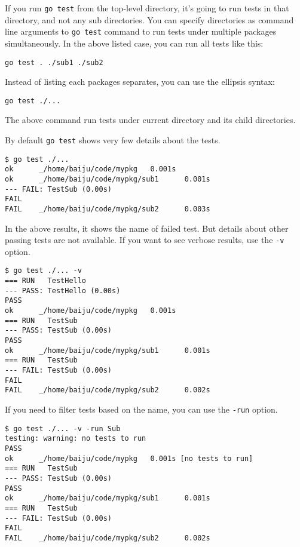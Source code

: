 If you run \texttt{go test} from the top-level directory, it's going
to run tests in that directory, and not any sub directories.  You can
specify directories as command line arguments to \texttt{go test}
command to run tests under multiple packages simultaneously.
In the above listed case, you can run all tests like this:

\begin{lstlisting}[numbers=none]
go test . ./sub1 ./sub2
\end{lstlisting}

Instead of listing each packages separates, you can use the ellipsis
syntax:

\begin{lstlisting}[numbers=none]
go test ./...
\end{lstlisting}

The above command run tests under current directory and its child
directories.

By default \texttt{go test} shows very few details about the tests.

\begin{lstlisting}[numbers=none]
$ go test ./...
ok      _/home/baiju/code/mypkg   0.001s
ok      _/home/baiju/code/mypkg/sub1      0.001s
--- FAIL: TestSub (0.00s)
FAIL
FAIL    _/home/baiju/code/mypkg/sub2      0.003s
\end{lstlisting}

In the above results, it shows the name of failed test.  But details
about other passing tests are not available.  If you want to see
verbose results, use the \texttt{-v} option.

\begin{lstlisting}[numbers=none]
$ go test ./... -v
=== RUN   TestHello
--- PASS: TestHello (0.00s)
PASS
ok      _/home/baiju/code/mypkg   0.001s
=== RUN   TestSub
--- PASS: TestSub (0.00s)
PASS
ok      _/home/baiju/code/mypkg/sub1      0.001s
=== RUN   TestSub
--- FAIL: TestSub (0.00s)
FAIL
FAIL    _/home/baiju/code/mypkg/sub2      0.002s
\end{lstlisting}

If you need to filter tests based on the name, you can use
the \texttt{-run} option.

\begin{lstlisting}[numbers=none]
$ go test ./... -v -run Sub
testing: warning: no tests to run
PASS
ok      _/home/baiju/code/mypkg   0.001s [no tests to run]
=== RUN   TestSub
--- PASS: TestSub (0.00s)
PASS
ok      _/home/baiju/code/mypkg/sub1      0.001s
=== RUN   TestSub
--- FAIL: TestSub (0.00s)
FAIL
FAIL    _/home/baiju/code/mypkg/sub2      0.002s
\end{lstlisting}

